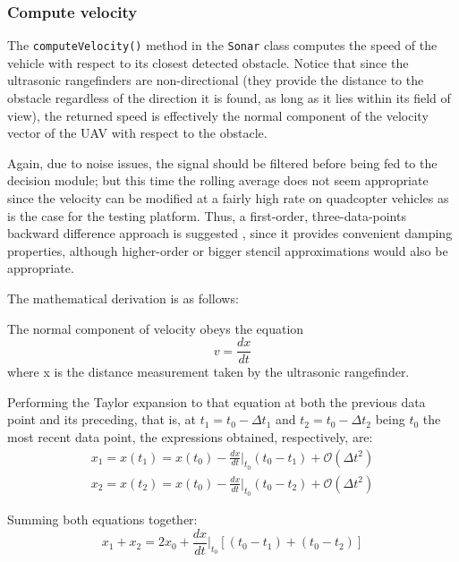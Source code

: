 \subsubsection{Compute velocity} \label{sec:velocity}

The \texttt{computeVelocity()} method in the \texttt{Sonar} class computes the speed of the vehicle with respect to its closest detected obstacle.
Notice that since the ultrasonic rangefinders are non-directional (they provide the distance to the obstacle regardless of the direction it is found, as long as it lies within its field of view), the returned speed is effectively the normal component of the velocity vector of the UAV with respect to the obstacle.

Again, due to noise issues, the signal should be filtered before being fed to the decision module; but this time the rolling average does not seem appropriate since the velocity can be modified at a fairly high rate on quadcopter vehicles as is the case for the testing platform.
Thus, a first-order, three-data-points backward difference approach is suggested \cite{asselin1972}, since it provides convenient damping properties, although higher-order or bigger stencil approximations would also be appropriate.

The mathematical derivation is as follows:

The normal component of velocity obeys the equation
\begin{equation}
	v=\frac{d x}{d t}
	\label{eq:v}
\end{equation}
where x is the distance measurement taken by the ultrasonic rangefinder.

Performing the Taylor expansion to that equation at both the previous data point and its preceding, that is, at $t_1=t_0-\Delta t_1$ and $t_2=t_0-\Delta t_2$ being $t_0$ the most recent data point, the expressions obtained, respectively, are:
\begin{eqnarray}
	x_1=x\left(t_1\right)=x\left(t_0\right) 
		- \frac{dx}{dt} \Bigg\rvert_{t_0} \left(t_0-t_1\right) 
		+ \mathcal{O}\left(\Delta t^2\right)	\\
	x_2=x\left(t_2\right)=x\left(t_0\right)
		- \frac{dx}{dt} \Bigg\rvert_{t_0} \left(t_0-t_2\right) 
		+ \mathcal{O}\left(\Delta t^2\right)
	\label{eq:taylor}
\end{eqnarray}

Summing both equations together:
\begin{equation}
	x_1+x_2=2x_0+\frac{dx}{dt}\Bigg\rvert_{t_0}
		\left[\left(t_0-t_1\right)+\left(t_0-t_2\right)\right]
	\label{eq:finite}
\end{equation}

